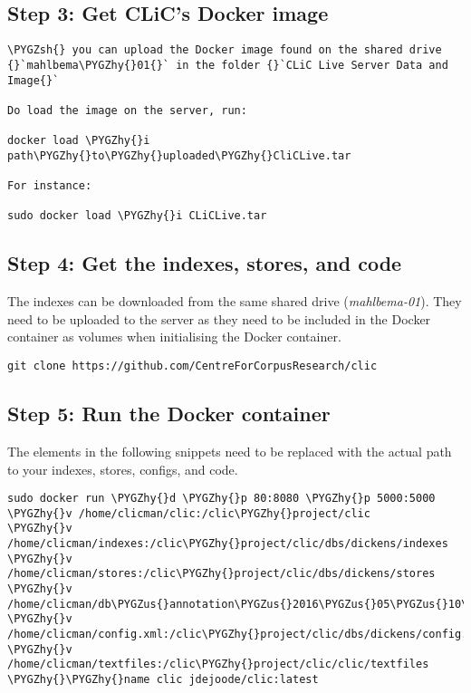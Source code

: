 \documentclass[letterpaper,10pt,english]{sphinxmanual}
\def\PYGZus{\char`\_}
\def\PYGZsh{\char`\#}
\def\PYGZhy{\char`\-}
\begin{document}
\subsection{Step 3: Get CLiC's Docker image}
\label{admin:step-3-get-clic-s-docker-image}
\begin{Verbatim}[commandchars=\\\{\}]
\PYGZsh{} you can upload the Docker image found on the shared drive
{}`mahlbema\PYGZhy{}01{}` in the folder {}`CLiC Live Server Data and Image{}`

Do load the image on the server, run:

docker load \PYGZhy{}i path\PYGZhy{}to\PYGZhy{}uploaded\PYGZhy{}CliCLive.tar

For instance:

sudo docker load \PYGZhy{}i CLiCLive.tar
\end{Verbatim}


\subsection{Step 4: Get the indexes, stores, and code}
\label{admin:step-4-get-the-indexes-stores-and-code}
The indexes can be downloaded from the same shared drive (\emph{mahlbema-01}).
They need to be uploaded to the server as they need to be included in the
Docker container as volumes when initialising the Docker container.

\begin{Verbatim}[commandchars=\\\{\}]
git clone https://github.com/CentreForCorpusResearch/clic
\end{Verbatim}


\subsection{Step 5: Run the Docker container}
\label{admin:step-5-run-the-docker-container}
The  elements in the following snippets need to be replaced with
the actual path to your indexes, stores, configs, and code.

\begin{Verbatim}[commandchars=\\\{\}]
sudo docker run \PYGZhy{}d \PYGZhy{}p 80:8080 \PYGZhy{}p 5000:5000
\PYGZhy{}v /home/clicman/clic:/clic\PYGZhy{}project/clic
\PYGZhy{}v /home/clicman/indexes:/clic\PYGZhy{}project/clic/dbs/dickens/indexes
\PYGZhy{}v /home/clicman/stores:/clic\PYGZhy{}project/clic/dbs/dickens/stores
\PYGZhy{}v /home/clicman/db\PYGZus{}annotation\PYGZus{}2016\PYGZus{}05\PYGZus{}10\PYGZus{}at\PYGZus{}12\PYGZus{}00.tar:/clic\PYGZhy{}project/clic/db\PYGZus{}annotation.tar
\PYGZhy{}v /home/clicman/config.xml:/clic\PYGZhy{}project/clic/dbs/dickens/config.xml
\PYGZhy{}v /home/clicman/textfiles:/clic\PYGZhy{}project/clic/clic/textfiles
\PYGZhy{}\PYGZhy{}name clic jdejoode/clic:latest
\end{Verbatim}
\end{document}
